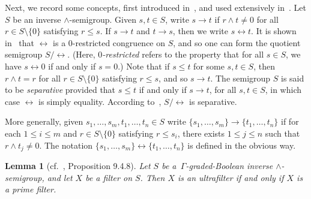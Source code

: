 \documentclass[a4paper,reqno,12pt]{amsart}
\numberwithin{equation}{section}
\theoremstyle{plain}
\newtheorem{lemma}[thm]{Lemma}
\theoremstyle{definition}
\begin{document}
Next, we record some concepts, first introduced in~\cite{Lenz}, and used extensively in~\cite{Lawson3}. Let $S$ be an inverse $\land$-semigroup. Given $s,t \in S$, write $s \to t$ if $r \land t \neq 0$ for all $r \in S \setminus \{0\}$ satisfying $r \leq s$. If $s \to t$ and $t \to s$, then we write $s \leftrightarrow t$. It is shown in~\cite[Lemma 2.1]{Lawson3} that $\leftrightarrow$ is a $0$-restricted congruence on $S$, and so one can form the quotient semigroup $S/\leftrightarrow$. (Here, \emph{$0$-restricted} refers to the property that for all $s \in S$, we have $s\leftrightarrow 0$ if and only if $s=0$.) Note that if $s\leq t$ for some $s,t \in S$, then $r \land t = r$ for all $r \in S \setminus \{0\}$ satisfying $r \leq s$, and so $s \to t$. The semigroup $S$ is said to be \emph{separative} provided that $s \leq t$ if and only if $s \to t$, for all $s,t \in S$, in which case $\leftrightarrow$ is simply equality. According to~\cite[Proposition 2.4]{Lawson3}, $S/\leftrightarrow$ is separative.

More generally, given $s_1, \dots, s_m, t_1, \dots, t_n \in S$ write $\{s_1, \dots, s_m\} \to \{t_1, \dots, t_n\}$ if for each $1 \leq i \leq m$ and $r \in S\setminus \{0\}$ satisfying $r \leq s_i$, there exists $1 \leq j \leq n$ such that $r \land t_j \neq 0$. The notation $\{s_1, \dots, s_m\} \leftrightarrow \{t_1, \dots, t_n\}$ is defined in the obvious way.

\begin{lemma}[cf.\ \cite{Lawson1}, Proposition 9.4.8] \label{ultrafilt-lem}
Let $S$ be a $\, \Gamma$-graded-Boolean inverse $\land$-semigroup, and let $X$ be a filter on $S$. Then $X$ is an ultrafilter if and only if $X$ is a prime filter.
\end{lemma}
\end{document}
